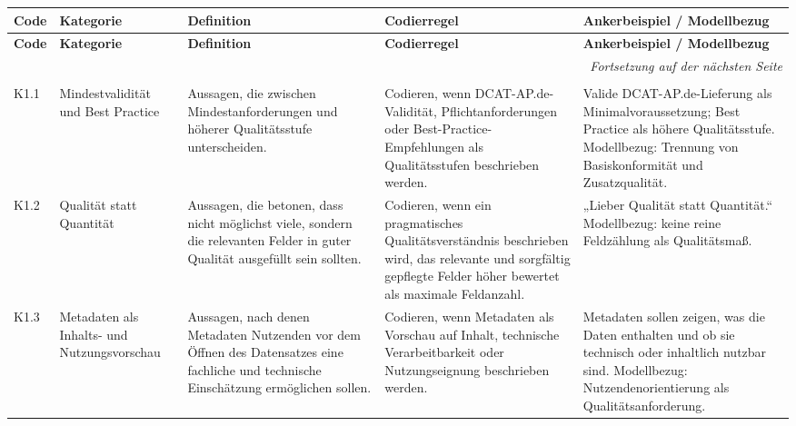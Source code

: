 
\begingroup
\tiny
\renewcommand{\arraystretch}{1}

\setlength{\LTleft}{-1.5cm}
\setlength{\LTright}{0pt}

\begin{longtable}{p{1cm} p{2.5cm} p{3.2cm} p{4.5cm} p{4.5cm}}
\label{tab:kodierleitfaden}\\

\toprule
\textbf{Code} & \textbf{Kategorie} & \textbf{Definition} & \textbf{Codierregel} & \textbf{Ankerbeispiel / Modellbezug} \\
\midrule
\endfirsthead

\toprule
\textbf{Code} & \textbf{Kategorie} & \textbf{Definition} & \textbf{Codierregel} & \textbf{Ankerbeispiel / Modellbezug} \\
\midrule
\endhead

\midrule
\multicolumn{5}{r}{\textit{Fortsetzung auf der nächsten Seite}} \\
\midrule
\endfoot

\bottomrule
\endlastfoot

\multicolumn{5}{l}{\textbf{K1 Qualitätsverständnis und ideale Metadaten}} \\
\midrule

K1.1 & Mindestvalidität und Best Practice
& Aussagen, die zwischen Mindestanforderungen und höherer Qualitätsstufe unterscheiden.
& Codieren, wenn DCAT-AP.de-Validität, Pflichtanforderungen oder Best-Practice-Empfehlungen als Qualitätsstufen beschrieben werden.
& Valide DCAT-AP.de-Lieferung als Minimalvoraussetzung; Best Practice als höhere Qualitätsstufe. Modellbezug: Trennung von Basiskonformität und Zusatzqualität. \\

K1.2 & Qualität statt Quantität
& Aussagen, die betonen, dass nicht möglichst viele, sondern die relevanten Felder in guter Qualität ausgefüllt sein sollten.
& Codieren, wenn ein pragmatisches Qualitätsverständnis beschrieben wird, das relevante und sorgfältig gepflegte Felder höher bewertet als maximale Feldanzahl.
& „Lieber Qualität statt Quantität.“ Modellbezug: keine reine Feldzählung als Qualitätsmaß. \\

K1.3 & Metadaten als Inhalts- und Nutzungsvorschau
& Aussagen, nach denen Metadaten Nutzenden vor dem Öffnen des Datensatzes eine fachliche und technische Einschätzung ermöglichen sollen.
& Codieren, wenn Metadaten als Vorschau auf Inhalt, technische Verarbeitbarkeit oder Nutzungseignung beschrieben werden.
& Metadaten sollen zeigen, was die Daten enthalten und ob sie technisch oder inhaltlich nutzbar sind. Modellbezug: Nutzendenorientierung als Qualitätsanforderung. \\


\end{longtable}
